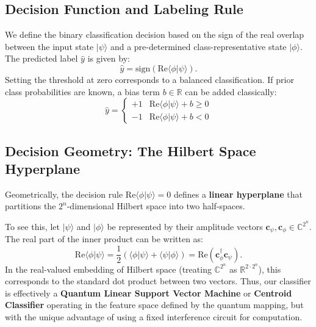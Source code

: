 \documentclass[conference]{IEEEtran}
\begin{document}
\subsection{Decision Function and Labeling Rule}

We define the binary classification decision based on the sign of the real overlap between the input state $|\psi\rangle$ and a pre-determined class-representative state $|\phi\rangle$. The predicted label $\hat{y}$ is given by:
\begin{equation}
\hat{y} = \text{sign}\left( \mathrm{Re}\langle \phi | \psi \rangle \right).
\end{equation}
Setting the threshold at zero corresponds to a balanced classification. If prior class probabilities are known, a bias term $b \in \mathbb{R}$ can be added classically:
\begin{equation}
\hat{y} = \begin{cases} +1 & \mathrm{Re}\langle \phi | \psi \rangle + b \geq 0 \\ -1 & \mathrm{Re}\langle \phi | \psi \rangle + b < 0 \end{cases}
\end{equation}

\subsection{Decision Geometry: The Hilbert Space Hyperplane}

Geometrically, the decision rule $\mathrm{Re}\langle \phi | \psi \rangle = 0$ defines a \textbf{linear hyperplane} that partitions the $2^n$-dimensional Hilbert space into two half-spaces. 

To see this, let $|\psi\rangle$ and $|\phi\rangle$ be represented by their amplitude vectors $\mathbf{c}_\psi, \mathbf{c}_\phi \in \mathbb{C}^{2^n}$. The real part of the inner product can be written as:
\begin{equation}
\mathrm{Re}\langle \phi | \psi \rangle = \frac{1}{2}\left( \langle \phi | \psi \rangle + \langle \psi | \phi \rangle \right) = \text{Re}(\mathbf{c}_\phi^\dagger \mathbf{c}_\psi).
\end{equation}
In the real-valued embedding of Hilbert space (treating $\mathbb{C}^{2^n}$ as $\mathbb{R}^{2 \cdot 2^n}$), this corresponds to the standard dot product between two vectors. Thus, our classifier is effectively a \textbf{Quantum Linear Support Vector Machine} or \textbf{Centroid Classifier} operating in the feature space defined by the quantum mapping, but with the unique advantage of using a fixed interference circuit for computation.
\end{document}
